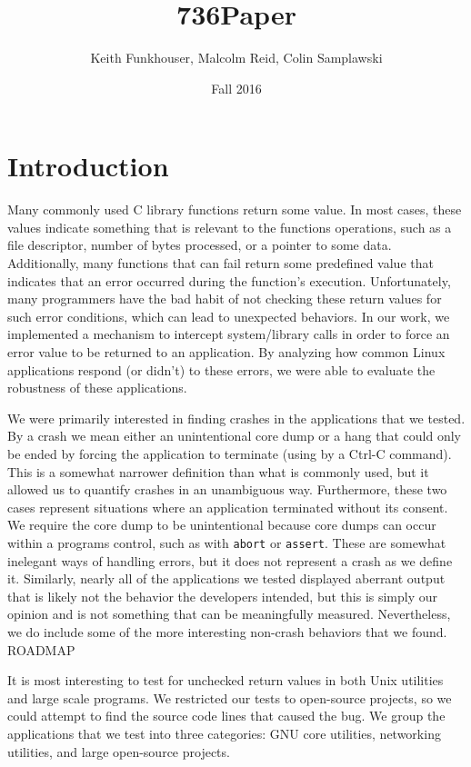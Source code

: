 \documentclass[10pt]{article}
\title{736Paper}
\author{Keith Funkhouser, Malcolm Reid, Colin Samplawski}
\date{Fall 2016}
\begin{document}
\setlength{\baselineskip}{18pt}
\maketitle

\section{Introduction}
Many commonly used C library functions return some value. In most cases, these values indicate something that is relevant to the  functions operations, such as a file descriptor, number of bytes processed, or a pointer to some data. Additionally, many functions that can fail return some predefined value that indicates that an error occurred during the function's execution. Unfortunately, many programmers have the bad habit of not checking these return values for such error conditions, which can lead to unexpected behaviors. In our work, we implemented a mechanism to intercept system/library calls in order to force an error value to be returned to an application. By analyzing how common Linux applications respond (or didn't) to these errors, we were able to evaluate the robustness of these applications.

We were primarily interested in finding crashes in the applications that we tested. By a crash we mean either an unintentional core dump or a hang that could only be ended by forcing the application to terminate (using by a Ctrl-C command). This is a somewhat narrower definition than what is commonly used, but it allowed us to quantify crashes in an unambiguous way. Furthermore, these two cases represent situations where an application terminated without its consent. We require the core dump to be unintentional because core dumps can occur within a programs control, such as with \texttt{abort} or \texttt{assert}. These are somewhat inelegant ways of handling errors, but it does not represent a crash as we define it. Similarly, nearly all of the applications we tested displayed aberrant output that is likely not the behavior the developers intended, but this is simply our opinion and is not something that can be meaningfully measured. Nevertheless, we do include some of the more interesting non-crash behaviors that we found. ROADMAP

It is most interesting to test for unchecked return values in both Unix utilities and large scale programs. We restricted our tests to open-source projects, so we could attempt to find the source code lines that caused the bug. We group the applications that we test into three categories: GNU core utilities, networking utilities, and large open-source projects.
\end{document}
